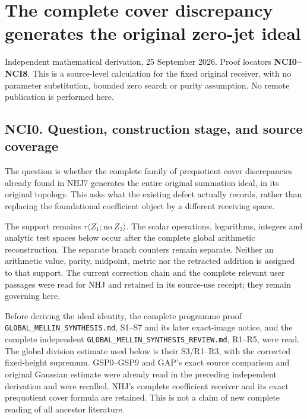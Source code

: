 \section{The complete cover discrepancy generates the original zero-jet
ideal}\label{the-complete-cover-discrepancy-generates-the-original-zero-jet-ideal}

Independent mathematical derivation, 25 September 2026. Proof locators
\textbf{NCI0--NCI8}. This is a source-level calculation for the fixed
original receiver, with no parameter substitution, bounded zero search
or purity assumption. No remote publication is performed here.

\subsection{NCI0. Question, construction stage, and source
coverage}\label{nci0.-question-construction-stage-and-source-coverage}

The question is whether the complete family of prequotient cover
discrepancies already found in NHJ7 generates the entire original
summation ideal, in its original topology. This asks what the existing
defect actually records, rather than replacing the foundational
coefficient object by a different receiving space.

The support remains \(\tau\langle Z_1;\mathrm{no}\ Z_2\rangle\). The
scalar operations, logarithms, integers and analytic test spaces below
occur after the complete global arithmetic reconstruction. The separate
branch counters remain separate. Neither an arithmetic value, parity,
midpoint, metric nor the retracted addition is assigned to that support.
The current correction chain and the complete relevant user passages
were read for NHJ and retained in its source-use receipt; they remain
governing here.

Before deriving the ideal identity, the complete programme proof
\texttt{GLOBAL\_MELLIN\_SYNTHESIS.md}, S1--S7 and its later exact-image
notice, and the complete independent
\nolinkurl{GLOBAL_MELLIN_SYNTHESIS_REVIEW.md}, R1--R5, were read. The
global division estimate used below is their S3/R1--R3, with the
corrected fixed-height supremum. GSP0--GSP9 and GAP's exact source
comparison and original Gaussian estimate were already read in the
preceding independent derivation and were recalled. NHJ's complete
coefficient receiver and its exact prequotient cover formula are
retained. This is not a claim of new complete reading of all ancestor
literature.


